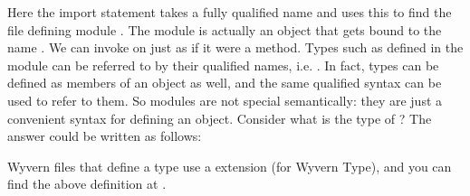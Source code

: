 \documentclass{article}
\begin{document}
\begin{mdPre}[class={para-block,pre-indented},data-line={292}]%
%
\end{mdPre}%
\begin{mdP}[data-line={298}]%
{}Here the import statement takes a fully qualified name and uses this to
find the file defining module %
{}%
{}.  The module is actually an object
that gets bound to the name %
{}%
{}.  We can invoke %
{}%
{} on %
{}%
{}
just as if it were a method.  Types such as %
{}%
{} defined in the %
{}%
{}
module can be referred to by their qualified names, i.e. %
{}%
{}.
In fact, types can be defined as members of an object as well, and the
same qualified syntax can be used to refer to them.  So modules are not
special semantically: they are just a convenient syntax for defining an
object.  Consider what is the type of %
{}%
{}?  The answer could be
written as follows:%
\end{mdP}%
\begin{mdPre}[class={para-block,pre-indented},data-line={309}]%
%
\end{mdPre}%
\begin{mdP}[data-line={316}]%
{}Wyvern files that define a type use a %
{}%
{} extension (for Wyvern Type),
and you can find the above definition at %
{}%
{}.%
\end{mdP}%
\end{document}
